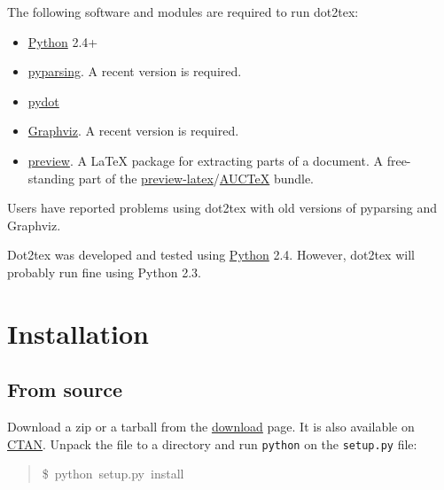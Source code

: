 \documentclass[10pt,a4paper,english]{article}
\begin{document}
The following software and modules are required to run dot2tex:
\begin{itemize}
\item {} 
\href{http://www.python.org}{Python} 2.4+

\item {} 
\href{http://pyparsing.wikispaces.com/}{pyparsing}. A recent version is required.

\item {} 
\href{http://dkbza.org/pydot.html}{pydot}

\item {} 
\href{http://www.graphviz.org/}{Graphviz}. A recent version is required.

\item {} 
\href{http://www.ctan.org/tex-archive/help/Catalogue/entries/preview.html}{preview}. A LaTeX package for extracting parts of a document. A free-standing part of the \href{http://www.gnu.org/software/auctex/preview-latex.html}{preview-latex}/\href{http://www.gnu.org/software/auctex/}{AUCTeX} bundle.

\end{itemize}

Users have reported problems using dot2tex with old versions of pyparsing and Graphviz.

Dot2tex was developed and tested using \href{http://www.python.org}{Python} 2.4. However, dot2tex will probably run fine using Python 2.3.



\hypertarget{installation}{}
\section*{Installation}
\label{installation}



\hypertarget{from-source}{}
\subsection*{From source}
\label{from-source}

Download a zip or a tarball from the \href{http://www.fauskes.net/code/dot2tex/download/}{download} page. It is also available on \href{http://www.ctan.org/tex-archive/help/Catalogue/entries/dot2tex.html}{CTAN}. Unpack the file to a directory and run \texttt{python} on the \texttt{setup.py} file:
\begin{quote}{\ttfamily \raggedright \noindent
{\$}~python~setup.py~install
}\end{quote}
\end{document}
